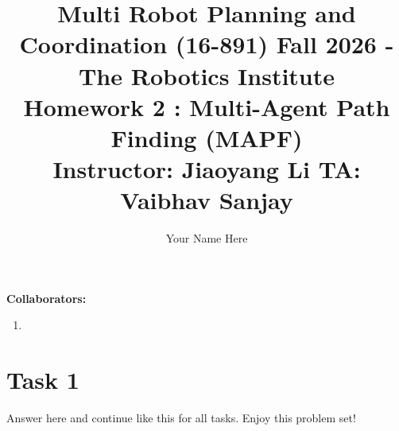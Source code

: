 \documentclass[11pt]{article}
\title
{ 
{\small Multi Robot Planning and Coordination (16-891) Fall 2026 - The Robotics Institute} \\
Homework 2 : Multi-Agent Path Finding (MAPF) \\
{\small Instructor: Jiaoyang Li \;\;\; TA: Vaibhav Sanjay }\\
}
\author{Your Name Here}
\begin{document}
\maketitle

\textbf{Collaborators: }
\begin{enumerate}
    \item 
\end{enumerate}

\section*{Task 1}
Answer here and continue like this for all tasks. Enjoy this problem set!
\end{document}
